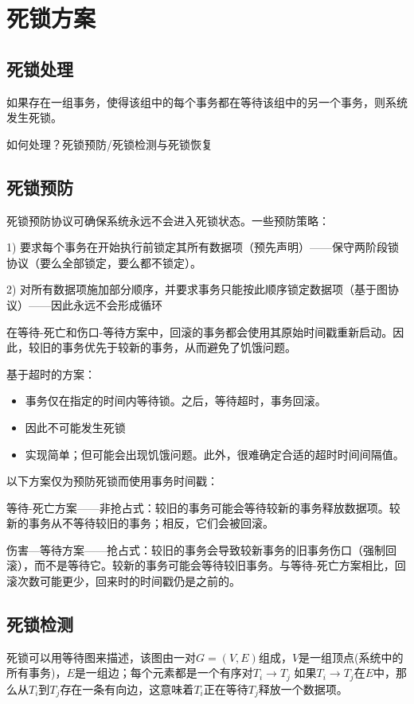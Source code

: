 \section{死锁方案}

\subsection{死锁处理}

如果存在一组事务，使得该组中的每个事务都在等待该组中的另一个事务，则系统发生死锁。

如何处理？死锁预防/死锁检测与死锁恢复

\subsection{死锁预防}

死锁预防协议可确保系统永远不会进入死锁状态。一些预防策略：

1) 要求每个事务在开始执行前锁定其所有数据项（预先声明）——保守两阶段锁协议（要么全部锁定，要么都不锁定）。

2) 对所有数据项施加部分顺序，并要求事务只能按此顺序锁定数据项（基于图协议）——因此永远不会形成循环

在等待-死亡和伤口-等待方案中，回滚的事务都会使用其原始时间戳重新启动。因此，较旧的事务优先于较新的事务，从而避免了饥饿问题。

基于超时的方案：
\begin{itemize}
    \item 事务仅在指定的时间内等待锁。之后，等待超时，事务回滚。
    \item 因此不可能发生死锁
    \item 实现简单；但可能会出现饥饿问题。此外，很难确定合适的超时时间间隔值。
\end{itemize}

以下方案仅为预防死锁而使用事务时间戳：

等待-死亡方案——非抢占式：较旧的事务可能会等待较新的事务释放数据项。较新的事务从不等待较旧的事务；相反，它们会被回滚。

伤害—等待方案——抢占式：较旧的事务会导致较新事务的旧事务伤口（强制回滚），而不是等待它。较新的事务可能会等待较旧事务。与等待-死亡方案相比，回滚次数可能更少，回来时的时间戳仍是之前的。

\subsection{死锁检测}

死锁可以用等待图来描述，该图由一对$G=(V,E)$组成，$V$是一组顶点(系统中的所有事务)，$E$是一组边；每个元素都是一个有序对$T_i\to T_j$
如果$T_i\to T_j$在$E$中，那么从$T_i$到$T_j$存在一条有向边，这意味着$T_i$正在等待$T_j$释放一个数据项。

